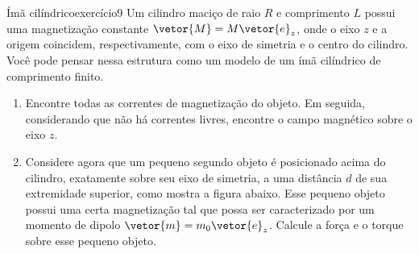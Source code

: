 \begin{exercício}{Ímã cilíndrico}{exercício9}
    Um cilindro maciço de raio \(R\) e comprimento \(L\) possui uma magnetização constante \(\vetor{M} = M \vetor{e}_z\), onde o eixo \(z\) e a origem coincidem, respectivamente, com o eixo de simetria e o centro do cilindro. Você pode pensar nessa estrutura como um modelo de um ímã cilíndrico de comprimento finito.
    \begin{enumerate}[label=(\alph*)]
        \item Encontre todas as correntes de magnetização do objeto. Em seguida, considerando que não há correntes livres, encontre o campo magnético sobre o eixo \(z\).
        \item Considere agora que um pequeno segundo objeto é posicionado acima do cilindro, exatamente sobre seu eixo de simetria, a uma distância \(d\) de sua extremidade superior, como mostra a figura abaixo. Esse pequeno objeto possui uma certa magnetização tal que possa ser caracterizado por um momento de dipolo \(\vetor{m} = m_0 \vetor{e}_z\). Calcule a força e o torque sobre esse pequeno objeto.
    \begin{center}
\end{center}
\end{enumerate}
\end{exercício}
